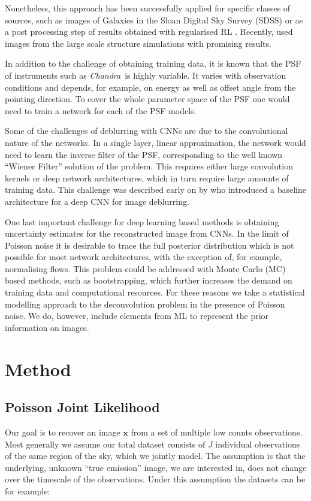 \documentclass[twocolumn]{aastex631}
\newcommand{\chandra}{\textit{Chandra}~}
\begin{document}
    Nonetheless, this approach has been successfully applied for specific classes of sources, such as images of Galaxies in the Sloan Digital Sky Survey (SDSS) \citep{Schawinski2017} or as a post processing step of results obtained with regularised RL \citep{Akhaury2022}. Recently, \cite{Sweere2022} used images from the large scale structure simulations with promising results.

    In addition to the challenge of obtaining training data, it is known that the PSF of instruments such as \chandra is highly variable. It varies with observation conditions and depends, for example, on energy as well as offset angle from the pointing direction. To cover the whole parameter space of the PSF one would need to train a network for each of the PSF models.

    Some of the challenges of deblurring with CNNs are due to the convolutional nature of the networks. In a single layer, linear approximation, the network would need to learn the inverse filter of the PSF, corresponding to the well known \enquote{Wiener Filter} solution of the problem. This requires either large convolution kernels or deep network architectures, which in turn require large amounts of training data. This challenge was described early on by \cite{Li2014} who introduced a baseline architecture for a deep CNN for image deblurring.
    
    One last important challenge for deep learning based methods is obtaining uncertainty estimates for the reconstructed image from CNNs. In the limit of Poisson noise it is desirable to trace the full posterior distribution
    which is not possible for most network architectures, with the exception of, for example, normalising flows. This problem could be addressed with Monte Carlo (MC) based methods, such as bootstrapping, which further increases the demand on training data and computational resources. For these reasons we take a statistical modelling approach to the deconvolution problem in the presence of Poisson noise. We do, however, include elements from ML to represent the prior information on images.

    \section{Method}
    
    \subsection{Poisson Joint Likelihood}
    Our goal is to recover an image $\mathbf{x}$ from a set of multiple low counts observations. Most generally we assume our total dataset consists of $J$ individual observations of the same region of the sky, which we jointly model. The assumption is that the underlying, unknown \enquote{true emission} image, we are interested in, does not change over the timescale of the observations. Under this assumption the datasets can be for example:
\end{document}
